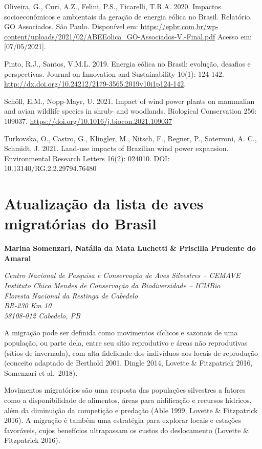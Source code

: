 \documentclass[
  oneside]{scrbook}
\begin{document}
Oliveira, G., Curi, A.Z., Felini, P.S., Ficarelli, T.R.A. 2020. Impactos socioeconômicos e ambientais da geração de energia eólica no Brasil. Relatório. GO Associados. São Paulo. Disponível em: \url{https://epbr.com.br/wp-content/uploads/2021/02/ABEEolica_GO-Associados-V.-Final.pdf} Acesso em: {[}07/05/2021{]}.

Pinto, R.J., Santos, V.M.L. 2019. Energia eólica no Brasil: evolução, desafios e perspectivas. Journal on Innovation and Sustainability 10(1): 124-142. \url{http://dx.doi.org/10.24212/2179-3565.2019v10i1p124-142}.

Schöll, E.M., Nopp-Mayr, U. 2021. Impact of wind power plants on mammalian and avian wildlife species in shrub- and woodlands. Biological Conservation 256: 109037. \url{https://doi.org/10.1016/j.biocon.2021.109037}

Turkovska, O., Castro, G., Klingler, M., Nitsch, F., Regner, P., Soterroni, A. C., Schmidt, J. 2021. Land-use impacts of Brazilian wind power expansion. Environmental Research Letters 16(2): 024010. DOI: 10.13140/RG.2.2.29794.76480

\hypertarget{cap2}{%
\chapter{Atualização da lista de aves migratórias do Brasil}\label{cap2}}

\textbf{Marina Somenzari, Natália da Mata Luchetti \& Priscilla Prudente do Amaral}

\emph{Centro Nacional de Pesquisa e Conservação de Aves Silvestres -- CEMAVE}\\
\emph{Instituto Chico Mendes de Conservação da Biodiversidade -- ICMBio}\\
\emph{Floresta Nacional da Restinga de Cabedelo}\\
\emph{BR-230 Km 10}\\
\emph{58108-012 Cabedelo, PB}

A migração pode ser definida como movimentos cíclicos e sazonais de uma população, ou parte dela, entre seu sítio reprodutivo e áreas não reprodutivas (sítios de invernada), com alta fidelidade dos indivíduos aos locais de reprodução (conceito adaptado de Berthold 2001, Dingle 2014, Lovette \& Fitzpatrick 2016, Somenzari et al.~2018).

Movimentos migratórios são uma resposta das populações silvestres a fatores como a disponibilidade de alimentos, áreas para nidificação e recursos hídricos, além da diminuição da competição e predação (Able 1999, Lovette \& Fitzpatrick 2016). A migração é também uma estratégia para explorar locais e estações favoráveis, cujos benefícios ultrapassam os custos do deslocamento (Lovette \& Fitzpatrick 2016).
\end{document}
